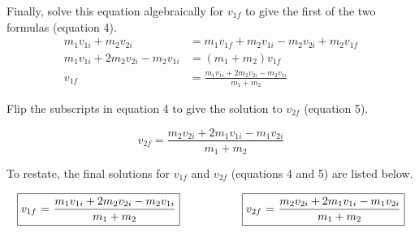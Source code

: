 \documentclass{article}
\begin{document}
\newpage
Finally, solve this equation algebraically for $v_{1f}$ to give the first of the two formulas (equation 4).
\vspace{0em}
\begin{align*}
    m_1v_{1i}+m_2v_{2i} &= m_1v_{1f}+m_2v_{1i}-m_2v_{2i}+m_2v_{1f}\\
    m_1v_{1i}+2m_2v_{2i}-m_2v_{1i} &= (m_1+m_2)v_{1f}\\
    v_{1f} &= \frac{m_1v_{1i}+2m_2v_{2i}-m_2v_{1i}}{m_1+m_2}\tag{4}
\end{align*}

Flip the subscripts in equation 4 to give the solution to $v_{2f}$ (equation 5).

\begin{equation*}
    v_{2f} = \frac{m_2v_{2i}+2m_1v_{1i}-m_1v_{2i}}{m_1+m_2}\tag{5}
\end{equation*}

To restate, the final solutions for $v_{1f}$ and $v_{2f}$ (equations 4 and 5) are listed below.

\begin{equation*}
    \fbox{$v_{1f}$ = $\dfrac{m_1v_{1i}+2m_2v_{2i}-m_2v_{1i}}{m_1+m_2}$} \hspace{0.76in} \fbox{$v_{2f}$ = $\dfrac{m_2v_{2i}+2m_1v_{1i}-m_1v_{2i}}{m_1+m_2}$}
\end{equation*}
\end{document}
